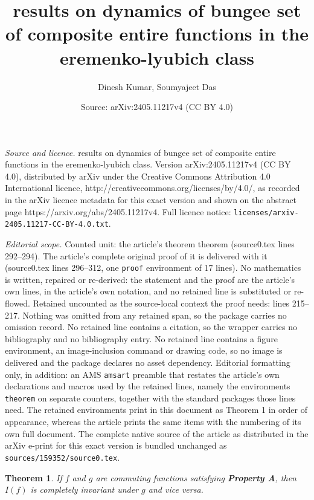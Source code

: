 \documentclass[10pt,a4paper]{amsart}
\title{results on dynamics of bungee set of composite entire functions in the eremenko-lyubich class}
\author{Dinesh Kumar, Soumyajeet Das}
\date{Source: arXiv:2405.11217v4 (CC BY 4.0)}
\newtheorem{theorem}{Theorem}
\begin{document}
\maketitle

\noindent\emph{Source and licence.} results on dynamics of bungee set of composite entire functions in the eremenko-lyubich class. Version arXiv:2405.11217v4 (CC BY 4.0), distributed by arXiv under the Creative Commons Attribution 4.0 International licence, http://creativecommons.org/licenses/by/4.0/, as recorded in the arXiv licence metadata for this exact version and shown on the abstract page https://arxiv.org/abs/2405.11217v4. Full licence notice: \texttt{licenses/arxiv-2405.11217-CC-BY-4.0.txt}.\par\smallskip

\noindent\textit{Editorial scope.} Counted unit: the article's theorem theorem (source0.tex lines 292--294). The article's complete original proof of it is delivered with it (source0.tex lines 296--312, one \texttt{proof} environment of 17 lines). No mathematics is written, repaired or re-derived: the statement and the proof are the article's own lines, in the article's own notation, and no retained line is substituted or re-flowed.  Retained uncounted as the source-local context the proof needs: lines 215--217.  Nothing was omitted from any retained span, so the package carries no omission record.  No retained line contains a citation, so the wrapper carries no bibliography and no bibliography entry.  No retained line contains a figure environment, an image-inclusion command or drawing code, so no image is delivered and the package declares no asset dependency.  Editorial formatting only, in addition: an AMS \texttt{amsart} preamble that restates the article's own declarations and macros used by the retained lines, namely the environments \texttt{theorem} on separate counters, together with the standard packages those lines need.  The retained environments print in this document as Theorem 1 in order of appearance, whereas the article prints the same items with the numbering of its own full document.  The complete native source of the article as distributed in the arXiv e-print for this exact version is bundled unchanged as \texttt{sources/159352/source0.tex}.
\begin{theorem} \label{Complete_invar_esp}
If $f$ and $g$ are commuting functions satisfying \textbf{Property A}, then $I(f)$ is completely invariant under $g$ and vice versa. 
\end{theorem}
\end{document}
